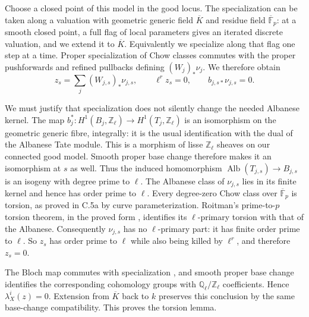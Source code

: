 Choose a closed point of this model in the good locus. The
specialization can be taken along a valuation with geometric
generic field $\overline K$ and residue field
$\overline{\mathbb F}_p$: at a smooth closed point, a full flag
of local parameters gives an iterated discrete valuation, and
we extend it to $\overline K$. Equivalently we specialize along
that flag one step at a time. Proper specialization of Chow
classes commutes with the proper pushforwards and refined
pullbacks defining $(W_j)_*\nu_j$. We therefore obtain
\[
 z_s=\sum_j(W_{j,s})_*\nu_{j,s},
 \qquad \ell^r z_s=0,\qquad b_{j,s*}\nu_{j,s}=0.
\]

We must justify that specialization does not silently change
the needed Albanese kernel. The map
$b_j^*:H^1(B_j,\mathbb Z_\ell)\to H^1(T_j,\mathbb Z_\ell)$ is an
isomorphism on the geometric generic fibre, integrally: it is
the usual identification with the dual of the Albanese Tate
module. This is a morphism of lisse $\mathbb Z_\ell$ sheaves
on our connected good model. Smooth proper base change
therefore makes it an isomorphism at $s$ as well. Thus the induced
homomorphism
$\operatorname{Alb}(T_{j,s})\to B_{j,s}$ is an isogeny with
degree prime to $\ell$. The Albanese class of $\nu_{j,s}$ lies
in its finite kernel and hence has order prime to $\ell$.
Every degree-zero Chow class over $\overline{\mathbb F}_p$ is
torsion, as proved in C.5a by curve parameterization. Roitman's
prime-to-$p$ torsion theorem, in the proved form
\citet[Theorem 4.2]{cyBloch1979}, identifies its $\ell$-primary
torsion with that of the Albanese. Consequently $\nu_{j,s}$ has
no $\ell$-primary part: it has finite order prime to $\ell$.
So $z_s$ has order prime to $\ell$ while also being killed by
$\ell^r$, and therefore $z_s=0$.

The Bloch map commutes with specialization
\citep[Proposition 3.8]{cyBloch1979}, and smooth proper base
change identifies the corresponding cohomology groups with
$\mathbb Q_\ell/\mathbb Z_\ell$ coefficients. Hence
$\lambda_X^i(z)=0$. Extension from $\overline K$ back to $k$
preserves this conclusion by the same base-change compatibility.
This proves the torsion lemma.

